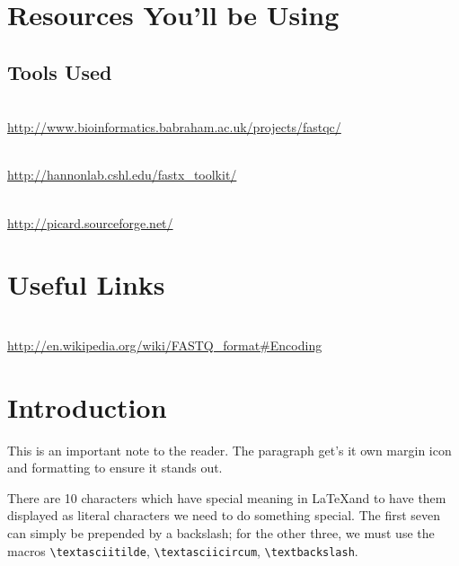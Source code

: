 \section{Resources You'll be Using}
 
\subsection{Tools Used}
\begin{description}[style=multiline,labelindent=0cm,align=left,leftmargin=0.5cm]
  \item[FastQC]\hfill\\
  	\url{http://www.bioinformatics.babraham.ac.uk/projects/fastqc/}
  \item[FASTX-Toolkit]\hfill\\
  	\url{http://hannonlab.cshl.edu/fastx_toolkit/}
  \item[Picard]\hfill\\
  	\url{http://picard.sourceforge.net/}
\end{description}

\section{Useful Links}
 
\begin{description}[style=multiline,labelindent=0cm,align=left,leftmargin=0.5cm]
  \item[FASTQ Encoding]\hfill\\
    \url{http://en.wikipedia.org/wiki/FASTQ_format#Encoding}
\end{description}

\newpage

\section{Introduction}

\begin{note}
This is an important note to the reader. The paragraph get's it own margin icon and formatting to
ensure it stands out.
\end{note}

There are 10 characters which have special meaning in \LaTeX and to have them displayed as literal
characters we need to do something special. The first seven can simply be prepended by a backslash;
for the other three, we must use the macros \verb+\textasciitilde+, \verb+\textasciicircum+,
\verb+\textbackslash+.


